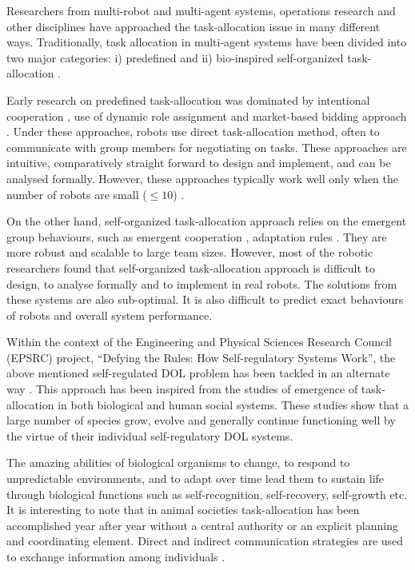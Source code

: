 Researchers from multi-robot and multi-agent systems, operations research and other disciplines have approached the task-allocation issue in many different ways. Traditionally, task allocation in  multi-agent systems have been divided into two major categories: i) predefined and ii) bio-inspired self-organized task-allocation \cite{Shen+2001}.

Early research on predefined task-allocation was dominated by intentional cooperation \cite{Parker2008}, use of dynamic role assignment \cite{Chaimowicz2002} and market-based bidding approach \cite{Dias+2006}. Under these approaches, robots use direct task-allocation method, often to communicate with group members for negotiating on tasks. These approaches are intuitive, comparatively straight forward to design and implement, and can be analysed formally. However, these approaches typically work well only when the number of robots are small ($\leq 10$) \cite{Lerman+2006}.

On the other hand, self-organized task-allocation approach relies on the emergent group behaviours, such as emergent cooperation \cite{Kube+1993}, adaptation rules \cite{Liu+2007}. They are more robust and scalable to large team sizes. However, most of the robotic researchers found that self-organized task-allocation approach is difficult to design, to analyse formally and to implement in real robots. The solutions from these systems are also sub-optimal. It is also difficult to predict exact behaviours of robots and overall system performance.

Within the context of the Engineering and Physical Sciences Research Council (EPSRC) project, ``Defying the Rules: How Self-regulatory Systems Work'', the above mentioned self-regulated DOL problem has been tackled in an alternate way \cite{Arcaute+2008}. This approach has been inspired from the studies of emergence of task-allocation in both biological and human social systems. These studies show that a large number of species grow, evolve and generally continue functioning well by the virtue of their individual self-regulatory DOL systems.

The amazing abilities of biological organisms to change, to respond to unpredictable environments, and to adapt over time lead them to sustain life through biological functions such as self-recognition, self-recovery, self-growth etc. It is interesting to note that in animal societies task-allocation has been accomplished year after year without a central authority or an explicit planning and coordinating element. Direct and indirect communication strategies are used to exchange information among individuals \cite{Camazine+2001}.

